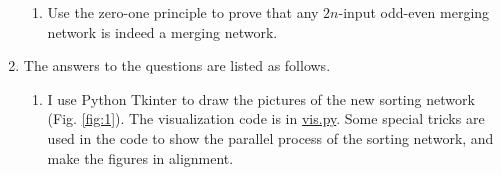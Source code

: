 \documentclass[12pt,a4paper]{article}
\makeatletter
\newtheorem*{solution}{Solution}
\theoremstyle{definition}
\renewenvironment{solution}[1][Solution] {\par\pushQED{\qed}\normalfont\topsep6\p@\@plus6\p@\relax\trivlist\item[\hskip\labelsep\bfseries#1\@addpunct{.}]\ignorespaces}{\popQED\endtrivlist\@endpefalse} \makeatother
\makeatother
\begin{document}
\begin{enumerate}
\begin{enumerate}
    	\item
    	{\color{red}{(Optional Sub-question with Bonus)}} Use the zero-one principle to prove that any $2n$-input odd-even merging network is indeed a merging network.
    \end{enumerate}
    \begin{solution} The answers to the questions are listed as follows.
    \begin{enumerate}
    \item I use Python Tkinter to draw the pictures of the new sorting network (Fig. \ref{fig:1}). The visualization code is in \href{run:code/vis.py}{vis.py}. Some special tricks are used in the code to show the parallel process of the sorting network, and make the figures in alignment.
    \begin{figure}[h]
        \centering


\end{figure}
\end{enumerate}
\end{solution}
\end{enumerate}
\end{document}
